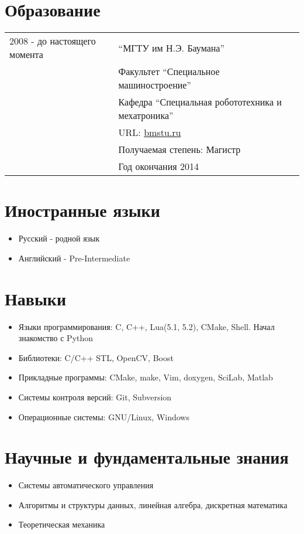 \documentclass[a4paper, 10pt]{article}
\begin{document}
\section{Образование}
\begin{tabular}{p{25mm}|p{110mm}}
2008 - до настоящего момента 
    & ``МГТУ им Н.Э. Баумана'' \\ 
    & Факультет ``Специальное машиностроение'' \\
    & Кафедра ``Специальная робототехника и мехатроника'' \\
    & URL: \href{http://bmstu.ru}{bmstu.ru} \\
    & Получаемая степень: Магистр \\
    & Год окончания 2014
\end{tabular}

\section{Иностранные языки}
\begin{itemize}
    \item Русский    - родной язык
    \item Английский - Pre-Intermediate
\end{itemize}

\section{Навыки}
\begin{itemize}
    \item Языки программирования:   C, C++, Lua(5.1, 5.2), CMake, Shell. Начал знакомство с Python
    \item Библиотеки:               C/C++ STL, OpenCV, Boost
    \item Прикладные программы:     CMake, make, Vim, doxygen, SciLab, Matlab
    \item Системы контроля версий:  Git, Subversion
    \item Операционные системы:     GNU/Linux, Windows
\end{itemize}

\section{Научные и фундаментальные знания}
\begin{itemize}
    \item Системы автоматического управления
    \item Алгоритмы и структуры данных, линейная алгебра, дискретная математика
    \item Теоретическая механика
\end{itemize}
\end{document}
